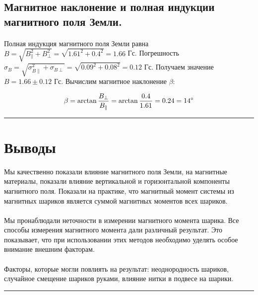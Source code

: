 \documentclass[a4paper,12pt]{article} %
\begin{document}
\subsection{Магнитное наклонение и полная индукции магнитного поля Земли.}

\paragraph{} Полная индукция магнитного поля Земли равна $B = \sqrt{B_\parallel^2 + B_\perp^2} = \sqrt{1.61^2 + 0.4^2} = 1.66$ Гс. Погрешность $\sigma_B = \sqrt{\sigma_{B \parallel}^2 + \sigma_{B \perp}} = \sqrt{0.09^2 + 0.08^2} = 0.12$ Гс. Получаем значение $B = 1.66 \pm 0.12$ Гс. Вычислим магнитное наклонение $\beta$:

\[ \beta = \arctan{\frac{B_\perp}{B_\parallel}} = \arctan{\frac{0.4}{1.61}} = 0.24 = 14\degree
\]

\medskip\hrule\medskip

\section{Выводы}

\paragraph{} Мы качественно показали влияние магнитного поля Земли, на магнитные материалы, показали влияние вертикальной и горизонтальной компоненты магнитного поля. Показали на практике, что магнитный момент системы из магнитных шариков является суммой магнитных моментов всех шариков.

\paragraph{} Мы пронаблюдали неточности в измерении магнитного момента шарика. Все способы измерения магнитного момента дали различный результат. Это показывает, что при использовании этих методов необходимо уделять особое внимание внешним факторам.

\paragraph{} Факторы, которые могли повлиять на результат: неоднородность шариков, случайное смещение шариков руками, влияние нитки в подвесе на шарики.

\medskip\hrule\medskip
\end{document}

